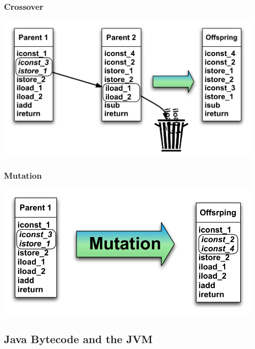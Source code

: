 \documentclass{beamer}
\begin{document}
\begin{frame}
	\frametitle{Crossover}

   \includegraphics[width=1\textwidth]{Illustrations/crossover.pdf}
       \\

\end{frame}

\begin{frame}
	\frametitle{Mutation}

   \includegraphics[width=1\textwidth]{Illustrations/mutation.pdf}
       \\

\end{frame}






\subsection[Bytecode and Assembly]{Java Bytecode and the JVM}
\end{document}
